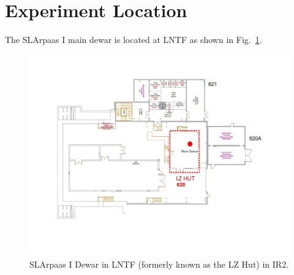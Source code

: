 \section{Experiment Location}
\label{sec:location}

The SLArpaas I main dewar is located at LNTF as shown in Fig.~\ref{fig:IR2Layout}.

\begin{figure}[h]
    \centering
    \includegraphics[width=\textwidth]{fig/IR2Layout.pdf}
    \caption{SLArpaas I Dewar in LNTF (formerly known as the LZ Hut) in IR2.}
    \label{fig:IR2Layout}
\end{figure}
